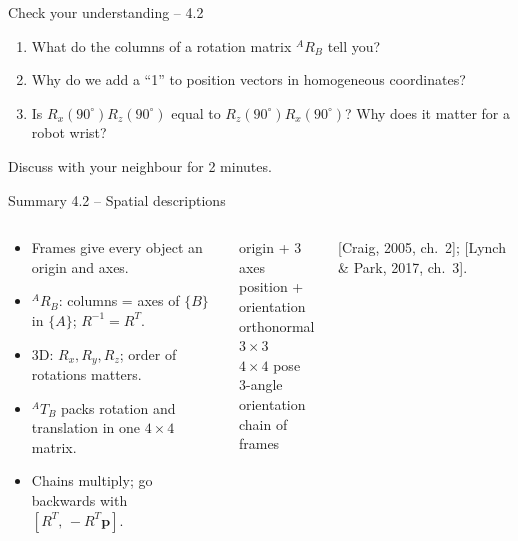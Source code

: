 \documentclass[aspectratio=169,10pt]{beamer}
\begin{document}
\begin{frame}[t]{Check your understanding -- 4.2}
\vspace{4mm}
\begin{keybox}
\large
\begin{enumerate}
\item What do the columns of a rotation matrix ${}^A\!R_B$ tell you?\\[2mm]
\item Why do we add a ``1'' to position vectors in homogeneous coordinates?\\[2mm]
\item Is $R_x(90^\circ)R_z(90^\circ)$ equal to $R_z(90^\circ)R_x(90^\circ)$? Why does it matter for a robot wrist?
\end{enumerate}
\end{keybox}
\vfill
\centering\small\color{mkGray} Discuss with your neighbour for 2 minutes.
\end{frame}

\begin{frame}[t]{Summary 4.2 -- Spatial descriptions}
\begin{columns}[T,onlytextwidth]
\begin{keybox}
\small
\begin{itemize}
\item Frames give every object an origin and axes.
\item ${}^A\!R_B$: columns = axes of $\{B\}$ in $\{A\}$; $R^{-1}=R^T$.
\item 3D: $R_x,R_y,R_z$; order of rotations matters.
\item ${}^AT_B$ packs rotation and translation in one $4\times4$ matrix.
\item Chains multiply; go backwards with $[R^T,\,-R^T\bm p]$.
\end{itemize}
\end{keybox}
\begin{defbox}
\small
{} origin + 3 axes\\
 position + orientation\\
 orthonormal $3\times3$\\
 $4\times4$ pose\\
 3-angle orientation\\
 chain of frames
\end{defbox}
{\scriptsize\color{mkGray} [Craig, 2005, ch.~2]; [Lynch \& Park, 2017, ch.~3].}
\end{columns}
\end{frame}
\end{document}
